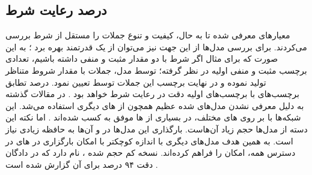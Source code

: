\subsection{درصد رعایت شرط}
معیارهای معرفی شده تا به حال، کیفیت و تنوع جملات را مستقل از شرط بررسی می‌کردند. برای بررسی مدل‌ها از این جهت نیز می‌توان از یک \classifier{} قدرتمند بهره برد 
\cite{toward, sentigan}؛
به این صورت که برای مثال اگر شرط با دو مقدار مثبت و منفی داشته باشیم، تعدادی برچسب مثبت و منفی اولیه در نظر گرفته؛ توسط مدل، جملات با مقدار شروط متناظر تولید نموده و در نهایت برچسب این جملات توسط \classifier{} تعیین نمود. درصد تطابق برچسب‌های \classifier{} با برچسب‌های اولیه دقت در رعایت شرط خواهد بود 
\cite{toward, sentigan}.
در مقالات گذشته به دلیل معرفی نشدن مدل‌های \pretrain{} شده عظیم همچون  از \classifier{}های دیگری استفاده می‌شد. این شبکه‌ها با 
بر روی \task{}‌های مختلف، در بسیاری از \task{}ها موفق به کسب \stateoftheart{} شده‌اند \cite{bert}. اما نکته این دسته از مدل‌ها حجم زیاد آن‌هاست. بارگذاری  این مدل‌ها در \gpu{} و \finetuning{} آن‌ها به حافظه زیادی نیاز است. به همین هدف مدل‌های دیگری با اندازه کوچکتر با امکان بارگزاری در \gpu{}‌های در دسترس همه، امکان \finetuning{} را فراهم کرده‌اند. نسخه کم حجم شده ، 
نام دارد که در دادگان  دقت ۹۴ درصد برای آن گزارش شده است \cite{distilbert}.
\iffalse
می‌توان به عنوان جایگزین از معیارهایی همچون \revperplexity{} استفاده نمود. این روش به این صورت است که یک مدل زبانی میانی با استفاده از نمونه‌های مدل آموزش داده شده و \likelihood{} نمونه‌های آموزشی در مدل آموزش داده شده اندازه‌گیری می‌شود. این معیار نیز حساس به کیفیت و تنوع است. اگر مدل میانی آموزش داده شده، چه به دلیل عدم تنوع  و یا عدم کیفیت نمونه‌های مدل مورد ارزیابی احتمال کمی به نمونه‌های آموزشی نسبت دهد، معیار حساس بوده و مدل را جریمه خواهد کرد. نکته قابل توجه این است که به دلیل اینکه معیار آموزش مدل میانی، بر اساس بیشینه کردن \likelihood{} است، این امکان وجود دارد تا مدل مورد آموزش رفتار \meanseeking{} از خود بروز داده و به نقاطی که نمونه آموزشی از آن‌ها وجود ندارد، احتمال بالایی نسبت دهد. اما این اتفاق زمانی رخ می‌دهد که ظرفیت مدل کمتر از پیچیدگی نمونه‌های آموزشی باشد؛ این در حالیست که این نمونه‌های آموزشی توسط مدل مشابهی با ظرفیت مشابه تولید شده اند و احتمالا چنین نگرانی‌ای وجود نخواهد داشت.
\fi
